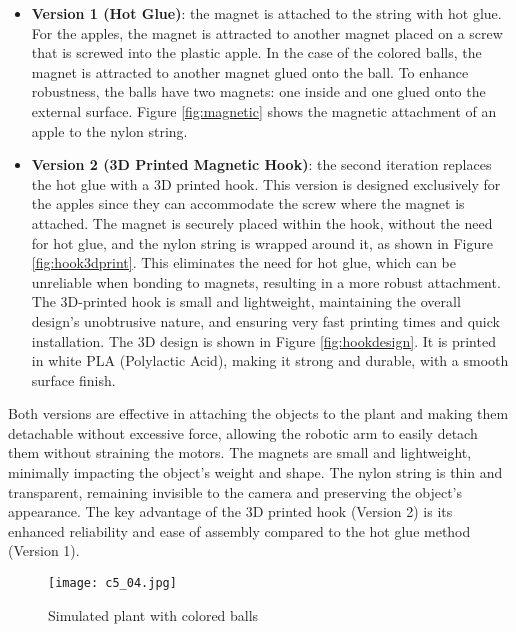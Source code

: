 \begin{itemize}
    \item \textbf{Version 1 (Hot Glue)}: the magnet is attached to the string with hot glue. 
    For the apples, the magnet is attracted to another magnet placed on a screw that is screwed into the plastic apple. 
    In the case of the colored balls, the magnet is attracted to another magnet glued onto the ball. 
    To enhance robustness, the balls have two magnets: one inside and one glued onto the external surface. 
    Figure \ref{fig:magnetic} shows the magnetic attachment of an apple to the nylon string.
    \item \textbf{Version 2 (3D Printed Magnetic Hook)}: the second iteration replaces the hot glue with a 3D printed hook. 
    This version is designed exclusively for the apples since they can accommodate the screw where the magnet is attached.
    The magnet is securely placed within the hook, without the need for hot glue, and the nylon string is wrapped around it,
    as shown in Figure \ref{fig:hook3dprint}. 
    This eliminates the need for hot glue, which can be unreliable when bonding to magnets, resulting in a more robust attachment.
    The 3D-printed hook is small and lightweight, maintaining the overall design's unobtrusive nature, and 
    ensuring very fast printing times and quick installation. The 3D design is shown in Figure \ref{fig:hookdesign}.
    It is printed in white PLA (Polylactic Acid), making it strong and durable, with a smooth surface finish.
\end{itemize}

Both versions are effective in attaching the objects to the plant and making them detachable without excessive force,
allowing the robotic arm to easily detach them without straining the motors. 
The magnets are small and lightweight, minimally impacting the object's weight and shape. 
The nylon string is thin and transparent, remaining invisible to the camera and preserving the object's appearance.
The key advantage of the 3D printed hook (Version 2) is its enhanced reliability and ease of assembly compared to 
the hot glue method (Version 1).

\begin{figure}[t]
    \centering
    \texttt{[image: c5\_04.jpg]}
    \caption{Simulated plant with colored balls}
    \label{fig:sim_plant}
\end{figure}

